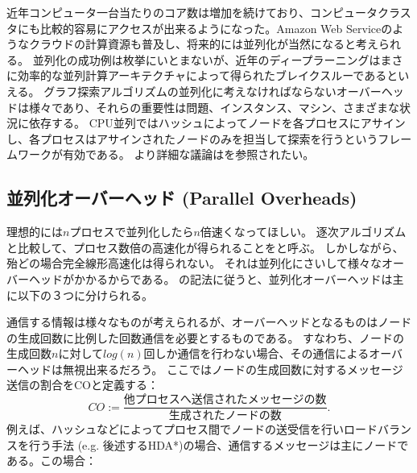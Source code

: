 近年コンピュータ一台当たりのコア数は増加を続けており、コンピュータクラスタにも比較的容易にアクセスが出来るようになった。Amazon Web Serviceのようなクラウドの計算資源も普及し、将来的には並列化が当然になると考えられる。
並列化の成功例は枚挙にいとまないが、近年のディープラーニングはまさに効率的な並列計算アーキテクチャによって得られたブレイクスルーであるといえる。
グラフ探索アルゴリズムの並列化に考えなければならないオーバーヘッドは様々であり、それらの重要性は問題、インスタンス、マシン、さまざまな状況に依存する。%
CPU並列ではハッシュによってノードを各プロセスにアサインし、各プロセスはアサインされたノードのみを担当して探索を行うというフレームワークが有効である。
より詳細な議論は\cite{fukunaga2017survey}を参照されたい。

\subsection{並列化オーバーヘッド (Parallel Overheads)}
\label{sec:parallel-overheads}

理想的には$n$プロセスで並列化したら$n$倍速くなってほしい。
逐次アルゴリズムと比較して、プロセス数倍の高速化が得られることをと呼ぶ。
しかしながら、殆どの場合完全線形高速化は得られない。
それは並列化にさいして様々なオーバーヘッドがかかるからである。
\cite{jinnai2017work}の記法に従うと、並列化オーバーヘッドは主に以下の３つに分けられる。


通信する情報は様々なものが考えられるが、オーバーヘッドとなるものはノードの生成回数に比例した回数通信を必要とするものである。
すなわち、ノードの生成回数$n$に対して$log(n)$回しか通信を行わない場合、その通信によるオーバーヘッドは無視出来るだろう。
ここではノードの生成回数に対するメッセージ送信の割合をCOと定義する：
\begin{equation}
	CO := \frac{\text{他プロセスへ送信されたメッセージの数}}{\text{生成されたノードの数}}.
\end{equation}
例えば、ハッシュなどによってプロセス間でノードの送受信を行いロードバランスを行う手法 (e.g. 後述するHDA*)の場合、通信するメッセージは主にノードである。この場合：

